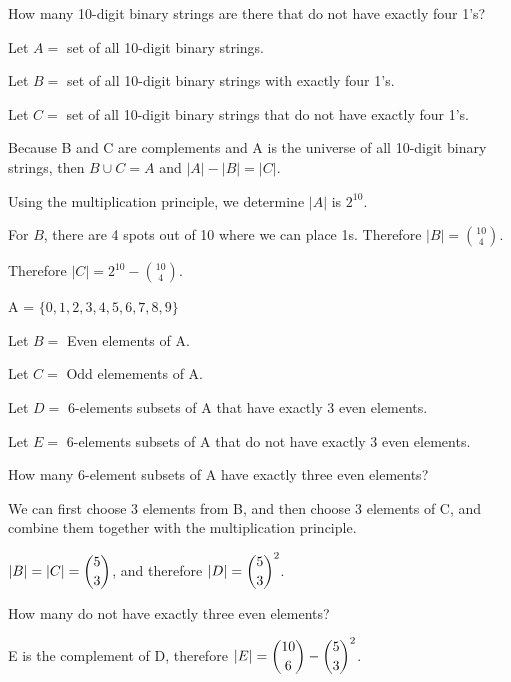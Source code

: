 \documentclass[openany, 12pt]{book}
\begin{document}
\begin{exercise}{}{}
	How many 10-digit binary strings are there that do not have exactly four
	1's?
	\begin{alist}
		\item Let $A=$ set of all 10-digit binary strings.
		\item Let $B=$ set of all 10-digit binary strings with exactly four 1's.
		\item Let $C=$ set of all 10-digit binary strings that do not have exactly
		four 1's.
		\item Because B and C are complements and A is the universe of all 10-digit
		binary strings, then $B \cup C = A$ and $|A|-|B| = |C|$.
		\item Using the multiplication principle, we determine $|A|$ is $2^{10}$.
		\item For $B$, there are 4 spots out of 10 where we can place 1s. Therefore
		\mbox{$|B|=\binom{10}{4}$}.
		\item Therefore $|C|=2^{10} - \binom{10}{4}$.
	\end{alist}
\end{exercise}

\begin{exercise}{}{}
	A = $\{ 0,1,2,3,4,5,6,7,8,9\}$
	\begin{alist}
		\item Let $B=$ Even elements of A.
		\item Let $C=$ Odd elemements of A.
		\item Let $D=$ 6-elements subsets of A that have exactly 3 even elements.
		\item Let $E=$ 6-elements subsets of A that do not have exactly 3 even elements.
		\item How many 6-element subsets of A have exactly three even elements?
		\item We can first choose 3 elements from B, and then choose 3 elements
		of C, and combine them together with the multiplication principle.
		\item $|B| = |C| = \dbinom{5}{3}$, and therefore $|D| = {\dbinom{5}{3}}^2$.
		\item How many do not have exactly three even elements?
		\item E is the complement of D, therefore $|E| = \dbinom{10}{6} -
			{\dbinom{5}{3}}^2$.
	\end{alist}
\end{exercise}
\end{document}
